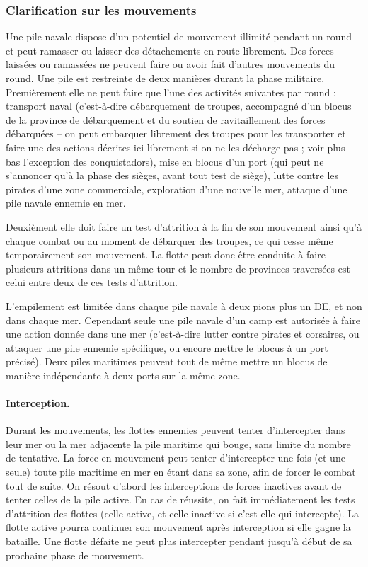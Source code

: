 \subsubsection{Clarification sur les mouvements}
Une pile navale dispose d'un potentiel de mouvement illimité 
pendant un round et peut ramasser ou laisser des détachements en
route librement. Des forces laissées ou ramassées ne peuvent faire ou avoir
fait d'autres mouvements du round. Une pile est restreinte de deux 
manières durant la phase militaire. Premièrement elle ne peut faire
que l'une des activités suivantes par round : transport naval 
(c'est-à-dire débarquement de troupes, accompagné 
d'un blocus de la province de débarquement et
du soutien de ravitaillement des forces débarquées -- on peut
embarquer librement des troupes pour les transporter et faire une
des actions décrites ici librement si on ne les décharge pas ;
voir plus bas l'exception des conquistadors), mise en
blocus d'un port (qui peut ne s'annoncer qu'à la phase des
sièges, avant tout test de siège), lutte contre les pirates d'une zone commerciale,
exploration d'une nouvelle mer, attaque d'une pile navale ennemie en mer.

Deuxièment elle doit faire un test d'attrition à la fin de son mouvement
ainsi qu'à chaque combat ou au moment de débarquer des troupes, 
ce qui cesse même temporairement son mouvement. La flotte
peut donc être conduite à faire plusieurs attritions dans un même tour 
et le nombre de provinces traversées est celui entre deux de ces tests
d'attrition.

L'empilement est limitée dans chaque pile navale à deux pions plus un DE,
et non dans chaque mer. Cependant seule une pile navale d'un camp est
autorisée à faire une action donnée dans une mer (c'est-à-dire lutter contre
pirates et corsaires, ou attaquer une pile ennemie spécifique, ou encore
mettre le blocus à un port précisé). Deux piles maritimes peuvent tout
de même mettre un blocus de manière indépendante à deux ports sur la 
même zone.

\paragraph{Interception.}
Durant les mouvements, les flottes ennemies peuvent tenter d'intercepter dans
leur mer ou la mer adjacente la pile maritime qui bouge, sans limite du
nombre de tentative. La force en mouvement peut tenter d'intercepter
une fois (et une seule) toute pile maritime en mer en étant dans sa zone, afin de
forcer le combat tout de suite. On résout d'abord les interceptions
de forces inactives avant de tenter celles de la pile active.
En cas de réussite, on fait immédiatement les tests
d'attrition des flottes (celle active, et celle inactive si c'est elle
qui intercepte). La flotte active pourra continuer son mouvement
après interception si elle gagne la bataille. Une flotte défaite ne
peut plus intercepter pendant jusqu'à début de sa prochaine phase de
mouvement.

